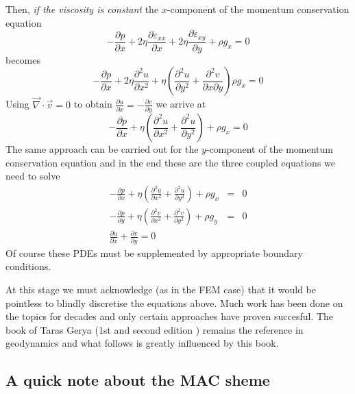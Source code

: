 Then, {\it if the viscosity is constant} the $x$-component of 
the momentum conservation equation
\[
-\frac{\partial p}{\partial x}  
+ 2\eta \frac{\partial \dot{\varepsilon}_{xx}}{\partial x} 
+ 2\eta \frac{\partial \dot{\varepsilon}_{xy}}{\partial y}  + \rho g_x =0
\]
becomes
\[
-\frac{\partial p}{\partial x}  
+ 2\eta \frac{\partial^2 u}{\partial x^2} 
+ \eta \left( \frac{\partial^2 u}{\partial y^2 } 
+ \frac{\partial^2 v}{\partial x \partial y} \right)  \rho g_x =0
\]
Using ${\vec \nabla} \cdot {\vec v} = 0$ to obtain 
$\frac{\partial u}{\partial x} =  - \frac{\partial v}{\partial y}  $ we arrive at 
\[
-\frac{\partial p}{\partial x}  
+ \eta \left( \frac{\partial^2 u}{\partial x^2} 
+ \frac{\partial^2 u}{\partial y^2 }  \right)
+ \rho g_x =0
\]
The same approach can be carried out for the $y$-component of the momentum conservation
equation and in the end
these are the three coupled equations we need to solve
\begin{eqnarray}
-\frac{\partial p}{\partial x}  
+ \eta \left( \frac{\partial^2 u}{\partial x^2} 
+ \frac{\partial^2 u}{\partial y^2 }  \right) + \rho g_x &=&0 \\
-\frac{\partial p}{\partial y}  
+ \eta \left( \frac{\partial^2 v}{\partial x^2} 
+ \frac{\partial^2 v}{\partial y^2 }  \right) + \rho g_y  &=& 0 \\
\frac{\partial u}{\partial x} + \frac{\partial v}{\partial y}  = 0 
\end{eqnarray}
Of course these PDEs must be supplemented by appropriate boundary conditions.

At this stage we must acknowledge (as in the FEM case) that it would be pointless
to blindly discretise the equations above. Much work has been done on the topics
for decades and only certain approaches have proven succesful. 
The book of Taras Gerya (1st and second edition \cite{gery10,gery19book}) 
remains the reference in geodynamics and what follows is greatly influenced by this book. 


\subsection{A quick note about the MAC sheme}

